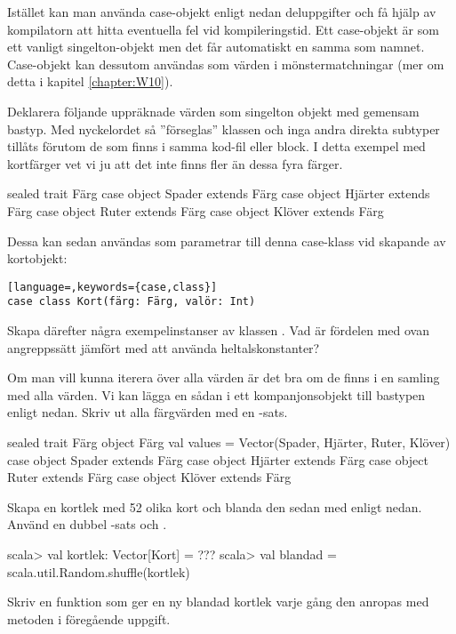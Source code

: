 Istället kan man använda case-objekt enligt nedan deluppgifter och få hjälp av kompilatorn att hitta eventuella fel vid kompileringstid.  Ett case-objekt är som ett vanligt singelton-objekt men det får automatiskt en  samma som namnet. Case-objekt kan dessutom användas som värden i mönstermatchningar (mer om detta i kapitel \ref{chapter:W10}).

\Subtask Deklarera följande uppräknade värden som singelton objekt med gemensam bastyp. Med nyckelordet  så ''förseglas'' klassen och inga andra direkta subtyper tillåts förutom de som finns i samma kod-fil eller block. I detta exempel  med kortfärger vet vi ju att det inte finns fler än dessa fyra färger.
\begin{Code}
sealed trait Färg
case object Spader extends Färg
case object Hjärter extends Färg
case object Ruter extends Färg
case object Klöver extends Färg
\end{Code}
Dessa kan sedan användas som parametrar till denna case-klass vid skapande av kortobjekt:
\begin{lstlisting}[language=,keywords={case,class}]
case class Kort(färg: Färg, valör: Int)
\end{lstlisting}
Skapa därefter några exempelinstanser av klassen . Vad är fördelen med ovan angreppssätt jämfört med att använda heltalskonstanter?

\Subtask Om man vill kunna iterera över alla värden är det bra om de finns i en samling med alla värden. Vi kan lägga en sådan i ett kompanjonsobjekt till bastypen enligt nedan. Skriv ut alla färgvärden med en -sats.

\begin{Code}
sealed trait Färg
object Färg {
  val values = Vector(Spader, Hjärter, Ruter, Klöver)
}
case object Spader extends Färg
case object Hjärter extends Färg
case object Ruter extends Färg
case object Klöver extends Färg
\end{Code}
Skapa en kortlek med 52 olika kort och blanda den sedan med  enligt nedan. Använd en dubbel -sats och .
\begin{REPL}
scala> val kortlek: Vector[Kort] = ???
scala> val blandad = scala.util.Random.shuffle(kortlek)
\end{REPL}

\Subtask Skriv en funktion  som ger en ny blandad kortlek varje gång den anropas med metoden i föregående uppgift.

